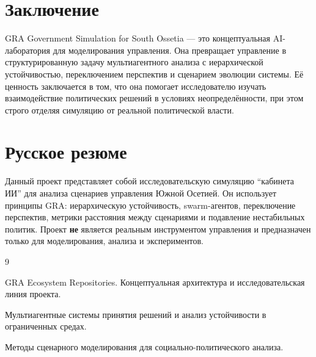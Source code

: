 \documentclass[11pt,a4paper]{article}
\begin{document}
\section{Заключение}

GRA Government Simulation for South Ossetia — это концептуальная AI-лаборатория для моделирования управления. Она превращает управление в структурированную задачу мультиагентного анализа с иерархической устойчивостью, переключением перспектив и сценарием эволюции системы. Её ценность заключается в том, что она помогает исследователю изучать взаимодействие политических решений в условиях неопределённости, при этом строго отделяя симуляцию от реальной политической власти.

\section*{Русское резюме}

Данный проект представляет собой исследовательскую симуляцию ``кабинета ИИ'' для анализа сценариев управления Южной Осетией. Он использует принципы GRA: иерархическую устойчивость, swarm-агентов, переключение перспектив, метрики расстояния между сценариями и подавление нестабильных политик. Проект \textbf{не} является реальным инструментом управления и предназначен только для моделирования, анализа и экспериментов.

\begin{thebibliography}{9}

GRA Ecosystem Repositories. Концептуальная архитектура и исследовательская линия проекта.

Мультиагентные системы принятия решений и анализ устойчивости в ограниченных средах.

Методы сценарного моделирования для социально-политического анализа.

\end{thebibliography}
\end{document}

